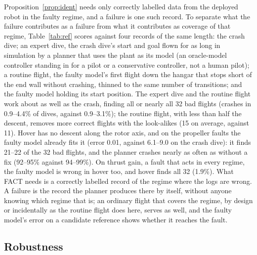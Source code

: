 \documentclass[preprint,12pt]{elsarticle}
\newcommand{\method}{FACT}
\begin{document}
Proposition~\ref{prop:ident} needs only correctly labelled data from the deployed robot in the faulty regime, and a failure is one such record. To separate what the failure contributes as a failure from what it contributes as coverage of that regime, Table~\ref{tab:ref} scores against four records of the same length: the crash dive; an expert dive, the crash dive's start and goal flown for as long in simulation by a planner that uses the plant as its model (an oracle-model controller standing in for a pilot or a conservative controller, not a human pilot); a routine flight, the faulty model's first flight down the hangar that stops short of the end wall without crashing, thinned to the same number of transitions; and the faulty model holding its start position. The expert dive and the routine flight work about as well as the crash, finding all or nearly all 32 bad flights (crashes in 0.9--4.4\% of dives, against 0.9--3.1\%); the routine flight, with less than half the descent, removes more correct flights with the look-alikes (15 on average, against 11). Hover has no descent along the rotor axis, and on the propeller faults the faulty model already fits it (error 0.01, against 6.1--9.0 on the crash dive): it finds 21--22 of the 32 bad flights, and the planner crashes nearly as often as without a fix (92--95\% against 94--99\%). On thrust gain, a fault that acts in every regime, the faulty model is wrong in hover too, and hover finds all 32 (1.9\%). What \method{} needs is a correctly labelled record of the regime where the logs are wrong. A failure is the record the planner produces there by itself, without anyone knowing which regime that is; an ordinary flight that covers the regime, by design or incidentally as the routine flight does here, serves as well, and the faulty model's error on a candidate reference shows whether it reaches the fault.

\subsection{Robustness}\label{sec:robust}
\end{document}
